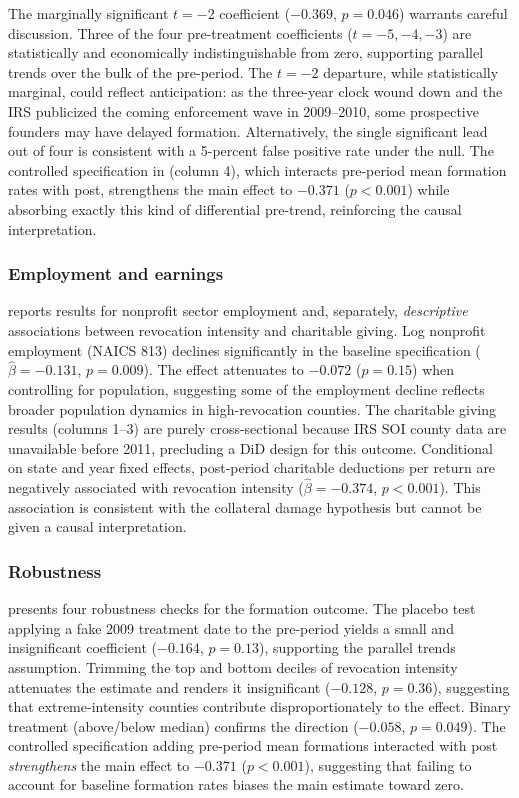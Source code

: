 \documentclass[12pt]{article}
\begin{document}
The marginally significant $t = -2$ coefficient ($-0.369$, $p = 0.046$) warrants careful discussion. Three of the four pre-treatment coefficients ($t = -5, -4, -3$) are statistically and economically indistinguishable from zero, supporting parallel trends over the bulk of the pre-period. The $t = -2$ departure, while statistically marginal, could reflect anticipation: as the three-year clock wound down and the IRS publicized the coming enforcement wave in 2009--2010, some prospective founders may have delayed formation. Alternatively, the single significant lead out of four is consistent with a 5-percent false positive rate under the null. The controlled specification in  (column 4), which interacts pre-period mean formation rates with post, strengthens the main effect to $-0.371$ ($p < 0.001$) while absorbing exactly this kind of differential pre-trend, reinforcing the causal interpretation.

\subsubsection*{Employment and earnings}
 reports results for nonprofit sector employment and, separately, \emph{descriptive} associations between revocation intensity and charitable giving. Log nonprofit employment (NAICS 813) declines significantly in the baseline specification ($\hat{\beta} = -0.131$, $p = 0.009$). The effect attenuates to $-0.072$ ($p = 0.15$) when controlling for population, suggesting some of the employment decline reflects broader population dynamics in high-revocation counties. The charitable giving results (columns 1--3) are purely cross-sectional because IRS SOI county data are unavailable before 2011, precluding a DiD design for this outcome. Conditional on state and year fixed effects, post-period charitable deductions per return are negatively associated with revocation intensity ($\hat{\beta} = -0.374$, $p < 0.001$). This association is consistent with the collateral damage hypothesis but cannot be given a causal interpretation.



\subsubsection*{Robustness}
 presents four robustness checks for the formation outcome. The placebo test applying a fake 2009 treatment date to the pre-period yields a small and insignificant coefficient ($-0.164$, $p = 0.13$), supporting the parallel trends assumption. Trimming the top and bottom deciles of revocation intensity attenuates the estimate and renders it insignificant ($-0.128$, $p = 0.36$), suggesting that extreme-intensity counties contribute disproportionately to the effect. Binary treatment (above/below median) confirms the direction ($-0.058$, $p = 0.049$). The controlled specification adding pre-period mean formations interacted with post \emph{strengthens} the main effect to $-0.371$ ($p < 0.001$), suggesting that failing to account for baseline formation rates biases the main estimate toward zero.
\end{document}
